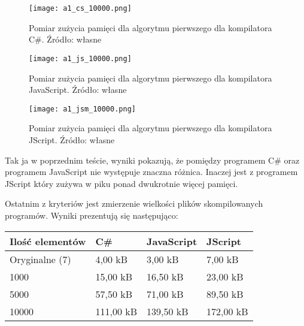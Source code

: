\begin{figure}[!h]
  \centering
  \texttt{[image: a1\_cs\_10000.png]}
  \caption{Pomiar zużycia pamięci dla algorytmu pierwszego dla kompilatora C\#. Źródło: własne}
  \label{fig:a}
\end{figure}

\begin{figure}[!h]
  \centering
  \texttt{[image: a1\_js\_10000.png]}
  \caption{Pomiar zużycia pamięci dla algorytmu pierwszego dla kompilatora JavaScript. Źródło: własne}
  \label{fig:a}
\end{figure}

\begin{figure}[!h]
  \centering
  \texttt{[image: a1\_jsm\_10000.png]}
  \caption{Pomiar zużycia pamięci dla algorytmu pierwszego dla kompilatora JScript. Źródło: własne}
  \label{fig:a}
\end{figure}

\newpage
\par Tak ja w poprzednim teście, wyniki pokazują, że pomiędzy programem C\# oraz programem JavaScript nie występuje znaczna różnica. Inaczej jest z programem JScript który zużywa w piku ponad dwukrotnie więcej pamięci.

\par Ostatnim z kryteriów jest zmierzenie wielkości plików skompilowanych programów. Wyniki prezentują się następująco:

\begin{table}[h!]
  \begin{tabular}{|l|l|l|l|}
  \hline
  Ilość elementów & C\#              & JavaScript       & JScript          \\ \hline
  Oryginalne (7)  & 4,00 kB & 3,00 kB & 7,00 kB \\ \hline
  1000            & 15,00 kB & 16,50 kB & 23,00 kB \\ \hline
  5000            & 57,50 kB & 71,00 kB & 89,50 kB \\ \hline
  10000           & 111,00 kB & 139,50 kB & 172,00 kB \\ \hline
  \end{tabular}
\end{table}


